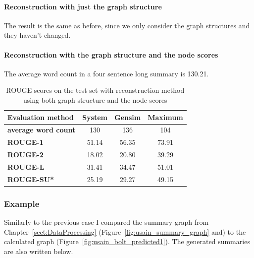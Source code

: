 \paragraph{Reconstruction with just the graph structure}

The result is the same as before, since we only consider the graph structures and they haven't changed.

\paragraph{Reconstruction with the graph structure and the node scores}

The average word count in a four sentence long summary is 130.21.

\begin{table}[!ht]
	\centering
	\begin{tabular}{| l | c | c | c |}
	\hline
		\textbf{Evaluation method}&\textbf{System}&\textbf{Gensim}&\textbf{Maximum}\\ \hline \hline
		\textbf{average word count}&130&136&104 \\ \hline
		\textbf{ROUGE-1}&51.14&56.35&73.91 \\ \hline
		\textbf{ROUGE-2}&18.02&20.80&39.29 \\ \hline
		\textbf{ROUGE-L}&31.41&34.47&51.01 \\ \hline
		\textbf{ROUGE-SU*}&25.19&29.27&49.15 \\ \hline
	\end{tabular}
	\caption{ROUGE scores on the test set with reconstruction method using both graph structure and the node scores}
	\label{tab:attended_complete}
\end{table}

\subsubsection{Example}
Similarly to the previous case I compared the summary graph from Chapter~\ref{sect:DataProcessing} (Figure~\ref{fig:usain_summary_graph} and) to the calculated graph (Figure~\ref{fig:usain_bolt_predicted1}). The generated summaries are also written below.

